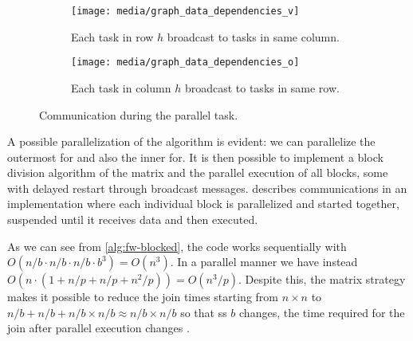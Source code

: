 \begin{figure}[htbp]
    \centering
    \begin{subfigure}[t]{0.3\textwidth}
        \centering
        \texttt{[image: media/graph\_data\_dependencies\_v]}
        \caption{Each task in row \(h\) broadcast to tasks in same column.}
        \label{fig:data-dependencies-v}
    \end{subfigure}
    \begin{subfigure}[t]{0.3\textwidth}
        \centering
        \texttt{[image: media/graph\_data\_dependencies\_o]}
        \caption{Each task in column \(h\) broadcast to tasks in same row.}
        \label{fig:data-dependencies-o}
    \end{subfigure}
    \caption{Communication during the parallel task.}
    \label{fig:communication-during-parallel-task}
\end{figure}

A possible parallelization of the algorithm is evident: we can parallelize the outermost for and also the inner for.
It is then possible to implement a block division algorithm of the matrix and the parallel execution of all blocks, some with delayed restart through broadcast messages.
  describes communications in an implementation where each individual block is parallelized and started together, suspended until it receives data and then executed.

As we can see from \cref{alg:fw-blocked}, the code works sequentially with \(O(n/b \cdot n/b \cdot n/b \cdot b^3) =O(n^3) \).
In a parallel manner we have instead \(O(n \cdot (1+n/p+n/p+ n^2/p)) = O(n^3/p)\).
Despite this, the matrix strategy makes it possible to reduce the join times starting from \(n\times n\) to \(n/b + n/b + n/b \times n/b \approx n/b \times n/b\) so that ss \(b\) changes, the time required for the join after parallel execution changes \cite{rucci}.

\FloatBarrier
